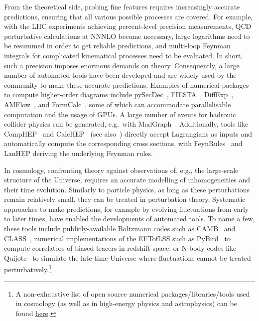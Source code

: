\documentclass[11pt]{article}
\numberwithin{equation}{section} %
\begin{document}
\vskip 4pt
From the theoretical side, probing fine features requires increasingly accurate predictions, ensuring that all various possible processes are covered. For example, with the LHC experiments achieving percent-level precision measurements, QCD perturbative calculations at NNNLO become necessary, large logarithms need to be resummed in order to get reliable predictions, and multi-loop Feynman integrals for complicated kinematical processes need to be evaluated. In short, such a precision imposes enormous demands on theory. Consequently, a large number of automated tools have been developed and are widely used by the community to make these accurate predictions. Examples of numerical packages to compute higher-order diagrams include \textsf{pySecDec}~\cite{Borowka:2017idc}, \textsf{FIESTA}~\cite{Smirnov:2008py, Smirnov:2009pb, Smirnov:2013eza}, \textsf{DiffExp}~\cite{Hidding:2020ytt}, \textsf{AMFlow}~\cite{Liu:2022chg}, and \textsf{FormCalc}~\cite{Hahn:1998yk}, some of which can accommodate parallelisable computation and the usage of GPUs. A large number of events for hadronic collider physics can be generated, e.g.~with \textsf{MadGraph}~\cite{Stelzer:1994ta, Alwall:2007st, Alwall:2011uj}. Additionally, tools like \textsf{CompHEP}~\cite{Pukhov:1999gg, CompHEP:2004qpa} and \textsf{CalcHEP}~\cite{Pukhov:2004ca, Belyaev:2012qa} (see also~\cite{Alwall:2014hca}) directly accept Lagrangians as inputs and automatically compute the corresponding cross sections, with \textsf{FeynRules}~\cite{Christensen:2008py, Christensen:2009jx, Alloul:2013bka} and \textsf{LanHEP}\cite{Semenov:2008jy} deriving the underlying Feynman rules. 


\vskip 4pt
In cosmology, confronting theory against observations of, e.g., the large-scale structure of the Universe, requires an accurate modelling of inhomogeneities and their time evolution. Similarly to particle physics, as long as these perturbations remain relatively small, they can be treated in perturbation theory. Systematic approaches to make predictions, for example by evolving fluctuations from early to later times, have enabled the developments of automated tools. To name a few, these tools include publicly-available Boltzmann codes such as \textsf{CAMB}~\cite{Lewis:1999bs} and \textsf{CLASS}~\cite{Blas:2011rf}, numerical implementations of the EFTofLSS such as \textsf{PyBird}~\cite{DAmico:2020kxu} to compute correlators of biased tracers in redshift space, or N-body codes like \textsf{Quijote}~\cite{Villaescusa-Navarro:2019bje} to simulate the late-time Universe where fluctuations cannot be treated perturbatively.\footnote{A non-exhaustive list of open source numerical packages/libraries/tools used in cosmology (as well as in high-energy physics and astrophysics) can be found \href{https://github.com/nikosarcevic/HEP-ASTRO-COSMO/\#cosmo}{here}.} 
\end{document}
